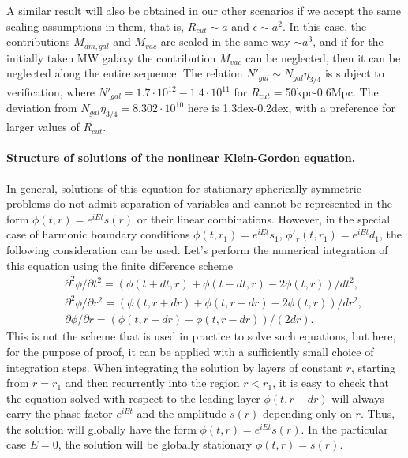 \documentclass{article}
\def\df{\partial}
\begin{document}
A similar result will also be obtained in our other scenarios if we accept the same scaling assumptions in them, that is, $ R_ {cut} \sim a $ and $ \epsilon \sim a ^ 2 $. In this case, the contributions $ M_ {dm, gal} $ and $ M_ {vac} $ are scaled in the same way $ \sim a ^ 3 $, and if for the initially taken MW galaxy the contribution $ M_ {vac} $ can be neglected, then it can be neglected along the entire sequence. The relation $ N '_ {gal} \sim N_ {gal} \eta_ {3/4} $ is subject to verification, where $ N' _ {gal} = 1.7 \cdot10 ^ {12} -1.4 \cdot10 ^ {11} $ for $ R_ {cut} =$50kpc-0.6Mpc. The deviation from $ N_ {gal} \eta_ {3/4} = 8.302 \cdot10 ^ {10} $ here is 1.3dex-0.2dex, with a preference for larger values of $ R_ {cut} $.

\paragraph * {Structure of solutions of the nonlinear Klein-Gordon equation.} In general, solutions of this equation for stationary spherically symmetric problems do not admit separation of variables and cannot be represented in the form $ \phi (t, r) = e ^ {iEt} s ( r) $ or their linear combinations. However, in the special case of harmonic boundary conditions $ \phi (t, r_1) = e ^ {iEt} s_1 $, $ \phi'_r (t, r_1) = e ^ {iEt} d_1 $, the following consideration can be used. Let's perform the numerical integration of this equation using the finite difference scheme 
\begin{eqnarray}
&&\df^2\phi/\df t^2=(\phi(t+dt,r)+\phi(t-dt,r)-2\phi(t,r))/dt^2,\\
&&\df^2\phi/\df r^2=(\phi(t,r+dr)+\phi(t,r-dr)-2\phi(t,r))/dr^2,\\
&&\df\phi/\df r=(\phi(t,r+dr)-\phi(t,r-dr))/(2dr). 
\end{eqnarray}
This is not the scheme that is used in practice to solve such equations, but here, for the purpose of proof, it can be applied with a sufficiently small choice of integration steps. When integrating the solution by layers of constant $ r $, starting from $ r = r_1 $ and then recurrently into the region $ r <r_1 $, it is easy to check that the equation solved with respect to the leading layer $ \phi (t, r-dr) $ will always carry the phase factor $ e ^ {iEt} $ and the amplitude $ s (r) $ depending only on $ r $. Thus, the solution will globally have the form $ \phi (t, r) = e ^ {iEt} s (r) $. In the particular case $ E = 0 $, the solution will be globally stationary $ \phi (t, r) = s (r) $.
\end{document}
